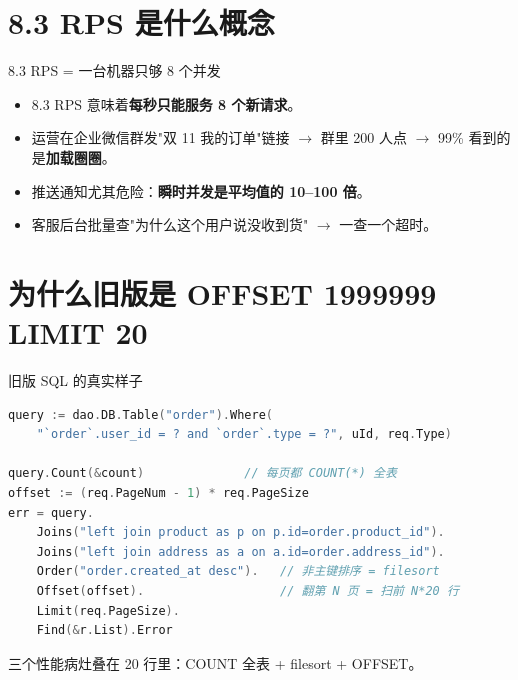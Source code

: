 \section{8.3 RPS 是什么概念}

\begin{frame}{8.3 RPS = 一台机器只够 8 个并发}
\vspace{2mm}
\begin{itemize}
  \item 8.3 RPS 意味着\textbf{每秒只能服务 8 个新请求}。
  \item 运营在企业微信群发"双 11 我的订单"链接 $\to$ 群里 200 人点 $\to$ 99\% 看到的是\textbf{加载圈圈}。
  \item 推送通知尤其危险：\textbf{瞬时并发是平均值的 10--100 倍}。
  \item 客服后台批量查"为什么这个用户说没收到货" $\to$ 一查一个超时。
\end{itemize}
\end{frame}

\section{为什么旧版是 OFFSET 1999999 LIMIT 20}

\begin{frame}[fragile]{旧版 SQL 的真实样子}
\begin{lstlisting}[language=Go,firstnumber=85,
  caption={\srcnote{repository/db/dao/order.go:85--105}}]
query := dao.DB.Table("order").Where(
    "`order`.user_id = ? and `order`.type = ?", uId, req.Type)

query.Count(&count)              // 每页都 COUNT(*) 全表
offset := (req.PageNum - 1) * req.PageSize
err = query.
    Joins("left join product as p on p.id=order.product_id").
    Joins("left join address as a on a.id=order.address_id").
    Order("order.created_at desc").   // 非主键排序 = filesort
    Offset(offset).                   // 翻第 N 页 = 扫前 N*20 行
    Limit(req.PageSize).
    Find(&r.List).Error
\end{lstlisting}
\small 三个性能病灶叠在 20 行里：COUNT 全表 + filesort + OFFSET。
\end{frame}

